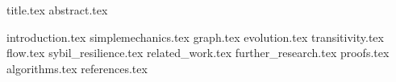 \documentclass[11pt]{llncs}
\begin{document}
{title.tex}
\thispagestyle{plain}
{abstract.tex}

{introduction.tex}
{simplemechanics.tex}
{graph.tex}
{evolution.tex}
{transitivity.tex}
{flow.tex}
{sybil_resilience.tex}
{related_work.tex}
{further_research.tex}
{proofs.tex}
{algorithms.tex}
{references.tex}
\end{document}
